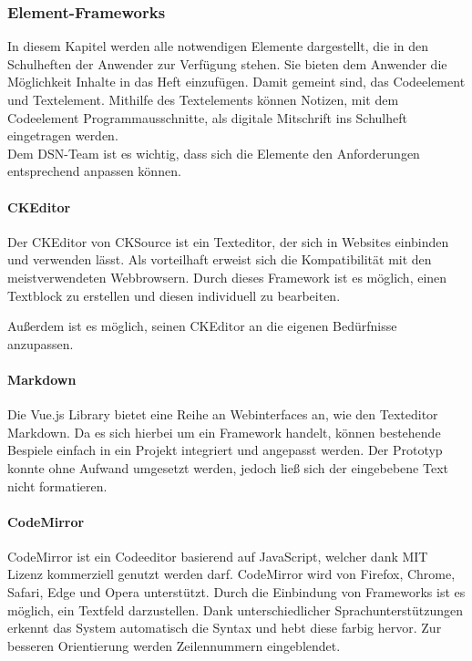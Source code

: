 \newpage

\subsubsection{Element-Frameworks}
In diesem Kapitel werden alle notwendigen Elemente dargestellt, die in den Schulheften der Anwender zur Verfügung stehen. Sie bieten dem Anwender die Möglichkeit Inhalte in das Heft einzufügen. Damit gemeint sind, das Codeelement und Textelement. Mithilfe des Textelements können Notizen, mit dem Codeelement Programmausschnitte, als digitale Mitschrift ins Schulheft eingetragen werden.\\
Dem DSN-Team ist es wichtig, dass sich die Elemente den Anforderungen entsprechend anpassen können.

\paragraph{CKEditor}
Der CKEditor von CKSource ist ein Texteditor, der sich in Websites einbinden und verwenden lässt. Als vorteilhaft erweist sich die Kompatibilität mit den meistverwendeten Webbrowsern. Durch dieses Framework ist es möglich, einen Textblock zu erstellen und diesen individuell zu bearbeiten.

Außerdem ist es möglich, seinen CKEditor an die eigenen Bedürfnisse anzupassen.\cite{CKEDITOR}


\newpage

\paragraph{Markdown}
Die Vue.js Library bietet eine Reihe an Webinterfaces an, wie den Texteditor Markdown. Da es sich hierbei um ein Framework handelt, können bestehende Bespiele einfach in ein Projekt integriert und angepasst werden. Der Prototyp konnte ohne Aufwand umgesetzt werden, jedoch ließ sich der eingebebene Text nicht formatieren. \cite{MARKDOWN}


\paragraph{CodeMirror}
CodeMirror ist ein Codeeditor basierend auf JavaScript, welcher dank MIT Lizenz kommerziell genutzt werden darf. CodeMirror wird von Firefox, Chrome, Safari, Edge und Opera unterstützt. Durch die Einbindung von Frameworks ist es möglich, ein Textfeld darzustellen. Dank unterschiedlicher Sprachunterstützungen erkennt das System automatisch die Syntax und hebt diese farbig hervor. Zur besseren Orientierung werden Zeilennummern eingeblendet. \cite{CODEMIRROR}

